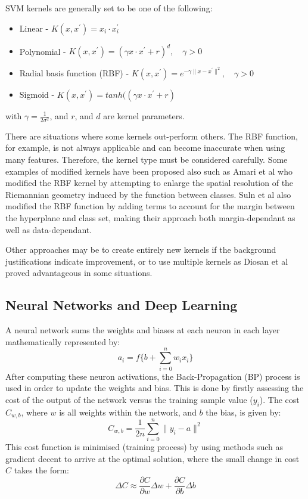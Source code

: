 \documentclass[fleqn,twoside,12pt]{report}
\begin{document}
SVM kernels are generally set to be one of the following:

\begin{itemize}
	\item Linear - $K(x, x^\prime) = x_i \cdot x_i^\prime$
	\item Polynomial - $K(x, x^\prime) = (\gamma x \cdot x^\prime + r) ^d, \quad \gamma > 0 \quad$
	\item Radial basis function (RBF) - $K(x, x^\prime) = e^{-\gamma\|x-x^\prime\|^2},  \quad \gamma > 0 \quad$
	\item Sigmoid - $K(x, x^\prime) = tanh((\gamma x \cdot x^\prime + r)$
\end{itemize}

with $\gamma = \frac{1}{2\sigma^2}$, and $r$, and $d$ are kernel parameters. 

There are situations where some kernels out-perform others. The RBF function, for example, is not always applicable and can become inaccurate when using many features. Therefore, the kernel type must be considered carefully. Some examples of modified kernels have been proposed also such as Amari et al \cite{amari} who modified the RBF kernel by attempting to enlarge the spatial resolution of the Riemannian geometry induced by the function between classes. Suln et al \cite{suln} also modified the RBF function by adding terms to account for the margin between the hyperplane and class set, making their approach both margin-dependant as well as data-dependant. 

Other approaches may be to create entirely new kernels if the background justifications indicate improvement, or to use multiple kernels as Diosan et al \cite{diosan} proved advantageous in some situations.



\subsection{Neural Networks and Deep Learning}

A neural network sums the weights and biases at each neuron in each layer mathematically represented by: 
\begin{equation}
a_i = f\bigg\{b + \sum_{i=0}^{n} w_i x_i \bigg\}	
\end{equation}
After computing these neuron activations, the Back-Propagation (BP) process is used in order to update the weights and bias. This is done by firstly assessing the cost of the output of the network versus the training sample value ($y_i$). The cost $C_{w,b}$, where $w$ is all weights within the network, and $b$ the bias, is given by:
\begin{equation}
C_{w,b} = \frac{1}{2n} \sum_{i=0}^{n} \|y_i - a\|^2	
\end{equation}
This cost function is minimised (training process) by using methods such as gradient decent to arrive at the optimal solution, where the small change in cost $C$ takes the form:
\begin{equation}
\Delta C \approx \frac{\partial C}{\partial w} \Delta w + \frac{\partial C}{\partial b} \Delta b	
\end{equation}
\end{document}
